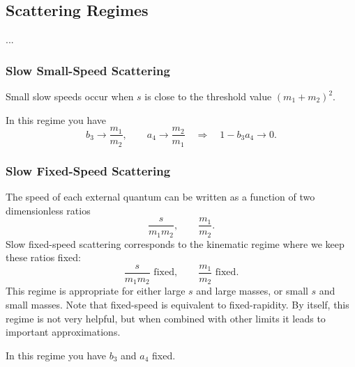 \subsection{Scattering Regimes}
...
\subsubsection{Slow Small-Speed Scattering}
Small slow speeds occur when $s$ is close to the threshold value $(m_{1} + m_{2})^{2}$.

In this regime you have
\begin{equation}
	b_{3} \rightarrow \frac{m_{1}}{m_{2}}, \qquad a_{4} \rightarrow \frac{m_{2}}{m_{1}} \quad \Longrightarrow \quad 1 - b_{3} a_{4} \rightarrow 0.
\end{equation}
\subsubsection{Slow Fixed-Speed Scattering}
The speed of each external quantum can be written as a function of two dimensionless ratios
\begin{equation}
	\frac{s}{m_{1} m_{2}}, \qquad \frac{m_{1}}{m_{2}}.
\end{equation}
Slow fixed-speed scattering corresponds to the kinematic regime where we keep these ratios fixed:
\begin{equation}
	\frac{s}{m_{1} m_{2}} \text{ fixed}, \qquad \frac{m_{1}}{m_{2}} \text{ fixed}.
\end{equation}
This regime is appropriate for either large $s$ and large masses, or small $s$ and small masses. Note that fixed-speed is equivalent to fixed-rapidity. By itself, this regime is not very helpful, but when combined with other limits it leads to important approximations.

In this regime you have $b_{3}$ and $a_{4}$ fixed.
